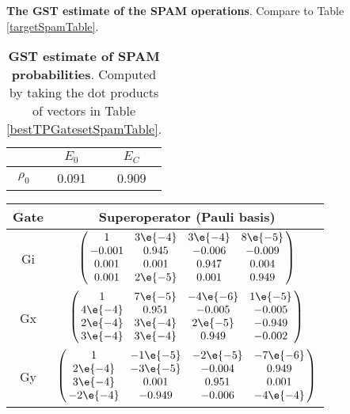 {\begin{table}[h]
\begin{center}
\caption{\textbf{The GST estimate of the SPAM operations}.  Compare to Table \ref{targetSpamTable}.\label{bestTPGatesetSpamTable}}
\end{center}
\end{table}

\begin{table}[h]
\begin{center}
\begin{tabular}[l]{|c|c|c|}
\hline
 & $E_{0}$ & $E_C$ \\ \hline
$\rho_{0}$ & 0.091 & 0.909 \\ \hline
\end{tabular}

\caption{\textbf{GST estimate of SPAM probabilities}.  Computed by taking the dot products of vectors in Table \ref{bestTPGatesetSpamTable}.\label{bestTPGatesetSpamParametersTable}}
\end{center}
\end{table}

\begin{table}[h]
\begin{center}
\begin{tabular}[l]{|c|c|}
\hline
Gate & Superoperator (Pauli basis) \\ \hline
Gi & $ \left(\!\!\begin{array}{cccc}
1 & 3\e{-4} & 3\e{-4} & 8\e{-5} \\ 
-0.001 & 0.945 & -0.006 & -0.009 \\ 
0.001 & 0.001 & 0.947 & 0.004 \\ 
0.001 & 2\e{-5} & 0.001 & 0.949
 \end{array}\!\!\right) $
 \\ \hline
Gx & $ \left(\!\!\begin{array}{cccc}
1 & 7\e{-5} & -4\e{-6} & 1\e{-5} \\ 
4\e{-4} & 0.951 & -0.005 & -0.005 \\ 
2\e{-4} & 3\e{-4} & 2\e{-5} & -0.949 \\ 
3\e{-4} & 3\e{-4} & 0.949 & -0.002
 \end{array}\!\!\right) $
 \\ \hline
Gy & $ \left(\!\!\begin{array}{cccc}
1 & -1\e{-5} & -2\e{-5} & -7\e{-6} \\ 
2\e{-4} & -3\e{-5} & -0.004 & 0.949 \\ 
3\e{-4} & 0.001 & 0.951 & 0.001 \\ 
-2\e{-4} & -0.949 & -0.006 & -4\e{-4}
 \end{array}\!\!\right) $
 \\ \hline
\end{tabular}


\end{center}
\end{table}}
